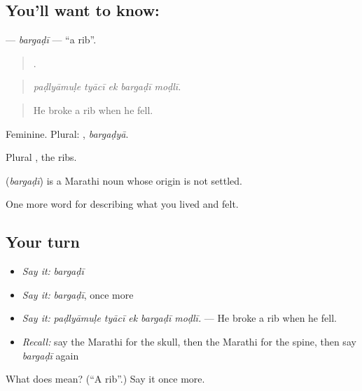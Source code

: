 \subsection*{You'll want to know: }
\textbf{} — \emph{bargaḍī} — \textquotedblleft{}a rib\textquotedblright{}.

\begin{quote}
    .
\end{quote}

\begin{quote}
\emph{paḍlyāmuḷe tyācī ek bargaḍī moḍlī.}
\end{quote}

\begin{quote}
He broke a rib when he fell.
\end{quote}

Feminine. Plural: , \emph{bargaḍyā}.

Plural , the ribs.

\begin{cousinweb}
\textbf{} (\emph{bargaḍī}) is a Marathi noun whose origin is not settled.
\end{cousinweb}

\begin{grammarlens}[title={What you've built}]
One more word for describing what you lived and felt.
\end{grammarlens}

\subsection*{Your turn}
\begin{itemize}
\raggedright
  \item \emph{Say it:} \emph{bargaḍī}
  \item \emph{Say it:} \emph{bargaḍī}, once more
  \item \emph{Say it:} \emph{paḍlyāmuḷe tyācī ek bargaḍī moḍlī.} — He broke a rib when he fell.
  \item \emph{Recall:} say the Marathi for the skull, then the Marathi for the spine, then say \emph{bargaḍī} again
\end{itemize}

\begin{tcolorbox}[breakable,colback=teal!4,colframe=teal!35!black,title={Before you move on}]
What does  mean? (\textquotedblleft{}A rib\textquotedblright{}.) Say it once more.
\end{tcolorbox}
